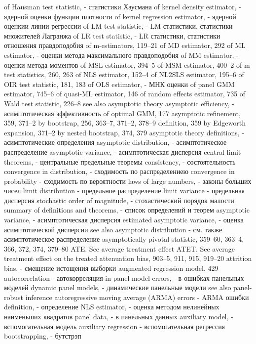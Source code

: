 of Hausman test statistic, - статистики Хаусмана
of kernel density estimator, - ядерной оценки функции плотности
of kernel regression estimator, - ядерной оценкии линии регрессии 
of LM test statistic, - LM статистики, статистики множителей Лагранжа
of LR test statistic, - LR статистики, статистики отношения правдоподобия
of m-estimators, 119–21
of MD estimator, 292
of ML estimator, - оценки метода максимального правдоподобия
of MM estimator, - оценки метода моментов
of MSL estimator, 394–5
of MSM estimator, 400–2 of m-test statistics, 260, 263 of NLS estimator, 152–4
of NL2SLS estimator, 195–6
of OIR test statistic, 181, 183
of OLS estimator, - МНК оценки 
of panel GMM estimator, 745–6 
of quasi-ML estimator, 146
of random effects estimator, 735 
of Wald test statistic, 226–8
see also asymptotic theory
asymptotic efficiency, - асимптотическая эффективность
of optimal GMM, 177
asymptotic refinement, 359, 371–2
by bootstrap, 256, 363–7, 371–2, 378–9 definition, 359
by Edgeworth expansion, 371–2
by nested bootstrap, 374, 379
asymptotic theory definitions, - асимптотические определения
asymptotic distribution, - асимптотическое распределение 
asymptotic variance, - асимптотическая дисперсия
central limit theorems, - центральные предельные теоремы 
consistency, - состоятельность
convergence in distribution, - сходимость по распределениею 
convergence in probability - сходимость по вероятности
laws of large numbers, - законы больших чисел 
limit distribution - предельное распределение
limit variance - предельная дисперсия
stochastic order of magnitude, - стохастический порядок малости 
summary of definitions and theorems, - список определений и теорем
asymptotic variance, - асимптотическая дисперсия 
estimated asymptotic variance,  - оценка асимптотической дисперсии
see also asymptotic distribution - см. также асимптотическое распределение
asymptotically pivotal statistic, 359–60, 363–4, 366, 372, 374, 379–80
ATE. See average treatment effect
ATET. See average treatment effect on the treated attenuation bias, 903–5, 911, 915, 919–20 attrition bias, - смещение истощения выборки
augmented regression model, 429
autocorrelation - автокорреляция
in panel model errors, - в ошибках панельных моделей 
dynamic panel models, - динамические панельные модели
see also panel-robust inference 
autoregressive moving average (ARMA) errors - ARMA ошибки
definition, - определение
NLS estimator, - оценка методом нелинейных наименьших квадратов
panel data, - в панельных данных
auxiliary model, - вспомогательная модель 
auxiliary regression - вспомогательная регрессия 
bootstrapping, - бутстрэп 
